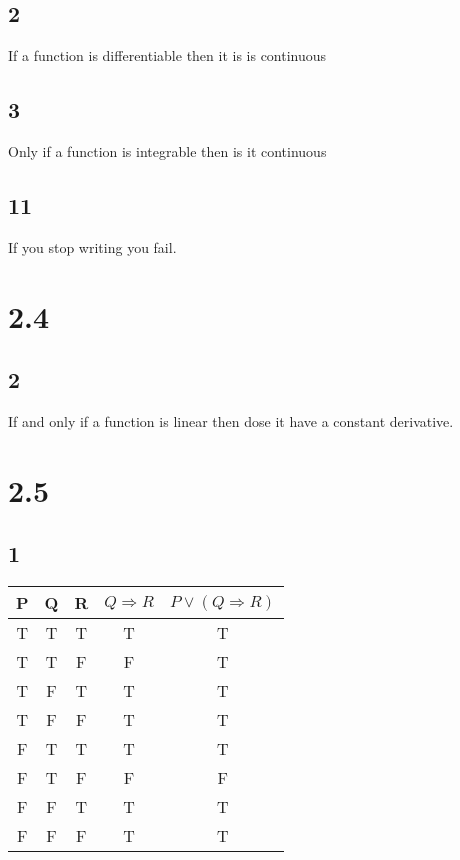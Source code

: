 \documentclass[sigconf]{article}
\begin{document}
\subsection*{2}
If a function is differentiable then it is is continuous

\subsection*{3}
Only if a function is integrable then is it continuous

\subsection*{11}
If you stop writing you fail.


\clearpage
\section*{2.4}
\subsection*{2}
If and only if a function is linear then dose it have a constant derivative.


\clearpage
\section*{2.5}
\subsection*{1}
\begin{center}
\begin{tabular}{ |c|c|c|c|c| } 
\hline
P & Q & R & $Q \Rightarrow R$ & $P \lor (Q \Rightarrow R)$ \\ 
\hline
T & T & T & T & T \\
\hline
T & T & F & F & T \\
\hline
T & F & T & T & T \\
\hline
T & F & F & T & T \\
\hline
F & T & T & T & T \\
\hline
F & T & F & F & F \\
\hline
F & F & T & T & T \\
\hline
F & F & F & T & T \\
\hline
\end{tabular}
\end{center}
\end{document}
